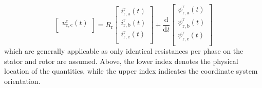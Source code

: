 \begin{frame}
\begin{equation}
\begin{bmatrix}
                u_{\mathrm{r,c}}^\mathrm{r}(t)\\
            \end{bmatrix} = R_\mathrm{r} \begin{bmatrix}
                i_{\mathrm{r,a}}^\mathrm{r}(t)\\
                i_{\mathrm{r,b}}^\mathrm{r}(t)\\
                i_{\mathrm{r,c}}^\mathrm{r}(t)\\
            \end{bmatrix} + \frac{\mathrm{d}}{\mathrm{d}t} \begin{bmatrix}
                \psi_{\mathrm{r,a}}^\mathrm{r}(t)\\
                \psi_{\mathrm{r,b}}^\mathrm{r}(t)\\
                \psi_{\mathrm{r,c}}^\mathrm{r}(t)\\
            \end{bmatrix}
            \label{eq:IM_rotor_three_phase_voltage_equation}
    \end{equation}
which are generally applicable as only identical resistances per phase on the stator and rotor are assumed. \pause Above, the lower index denotes the physical location of the quantities, while the upper index indicates the coordinate system orientation.
\end{frame}

